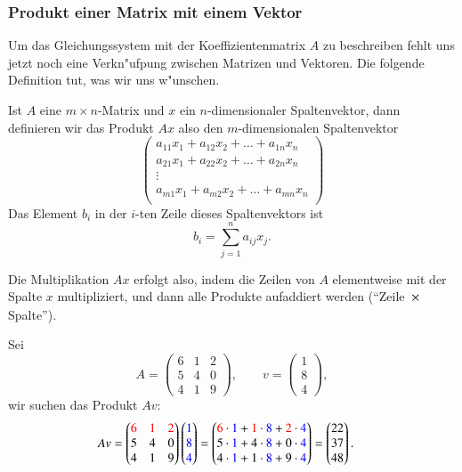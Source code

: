 \subsubsection{Produkt einer Matrix mit einem Vektor}
Um das Gleichungssystem mit der Koeffizientenmatrix $A$ zu beschreiben
fehlt uns jetzt noch eine Verkn"ufpung zwischen Matrizen und
Vektoren. Die folgende Definition tut, was wir uns w"unschen.
\begin{definition}
Ist $A$ eine $m\times n$-Matrix und $x$ ein $n$-dimensionaler Spaltenvektor,
dann definieren wir das Produkt $Ax$ also den $m$-dimensionalen
Spaltenvektor
$$
\begin{pmatrix}
a_{11}x_1+a_{12}x_2+\dots+a_{1n}x_n\\
a_{21}x_1+a_{22}x_2+\dots+a_{2n}x_n\\
\vdots\\
a_{m1}x_1+a_{m2}x_2+\dots+a_{mn}x_n\\
\end{pmatrix}
$$
Das Element $b_i$ in der $i$-ten Zeile dieses Spaltenvektors ist
$$b_i=\sum_{j=1}^na_{ij}x_j.$$
\end{definition}
Die Multiplikation $Ax$ erfolgt also, indem die Zeilen von $A$
elementweise mit der Spalte $x$ multipliziert, und dann alle Produkte
aufaddiert werden (``Zeile $\strut \times\mathstrut$ Spalte'').

\begin{beispiel} Sei
\[
A=\begin{pmatrix}
6&1&2\\
5&4&0\\
4&1&9
\end{pmatrix}
,\qquad
v=
\begin{pmatrix}
1\\8\\4
\end{pmatrix},
\]
wir suchen das Produkt $Av$:
\begin{align*}
Av&=
\begin{pmatrix}
\color{red}6&\color{red}1&\color{red}2\\
5&4&0\\
4&1&9
\end{pmatrix}
\begin{pmatrix}
\color{blue}1\\\color{blue}8\\\color{blue}4
\end{pmatrix}
=
\begin{pmatrix}
{\color{red}6}\cdot{\color{blue}1}+
{\color{red}1}\cdot{\color{blue}8}+
{\color{red}2}\cdot{\color{blue}4}
\\
5\cdot{\color{blue}1}+
4\cdot{\color{blue}8}+
0\cdot{\color{blue}4}
\\
4\cdot{\color{blue}1}+
1\cdot{\color{blue}8}+
9\cdot{\color{blue}4}
\end{pmatrix}
=\begin{pmatrix}
22\\37\\48
\end{pmatrix}.
\end{align*}
\end{beispiel}

